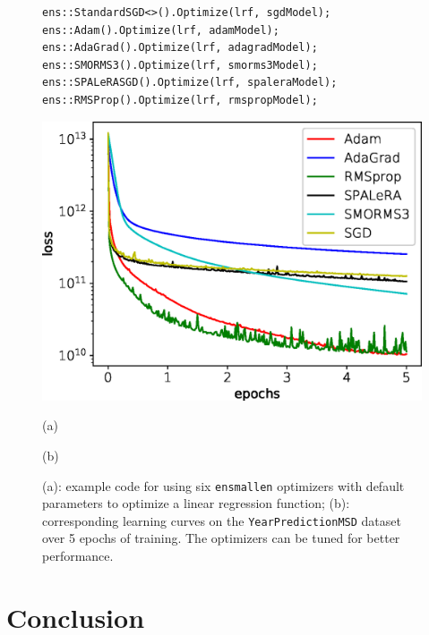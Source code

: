 \documentclass{article}
\begin{document}
\begin{figure}[h!]
\begin{minipage}[t]{1\textwidth}
\begin{adjustbox}{scale={0.90}{0.90}}
\begin{minipage}{0.48\textwidth}
\begin{verbatim}
ens::StandardSGD<>().Optimize(lrf, sgdModel);
ens::Adam().Optimize(lrf, adamModel);
ens::AdaGrad().Optimize(lrf, adagradModel);
ens::SMORMS3().Optimize(lrf, smorms3Model);
ens::SPALeRASGD().Optimize(lrf, spaleraModel);
ens::RMSProp().Optimize(lrf, rmspropModel);
\end{verbatim}
\end{minipage}
\end{adjustbox}
\hfill
\begin{minipage}{0.51\textwidth}
  \centering
  \includegraphics[width=\textwidth,height=0.5\textwidth]{experiments/learning_curves_crop.eps}
\end{minipage}
\end{minipage}
\begin{minipage}[t]{1\textwidth}
\begin{minipage}{0.48\textwidth}
\centering
(a)
\end{minipage}
\hfill
\begin{minipage}{0.51\textwidth}
\centering
(b)
\end{minipage}
\end{minipage}
\caption
  {
  \footnotesize
  (a): example code for using 
  six {\tt ensmallen} optimizers with default parameters
  to optimize a linear regression function;
  (b): corresponding learning curves
  on the \texttt{\small YearPredictionMSD} dataset~\cite{ucimlrepository}
  over 5 epochs of training.
  The optimizers can be tuned for better performance.
  }
\label{fig:learning_curve}
\vspace*{-1ex}
\end{figure}

\vspace*{-0.3em}
\section{Conclusion}
\vspace*{-0.5em}
\end{document}
